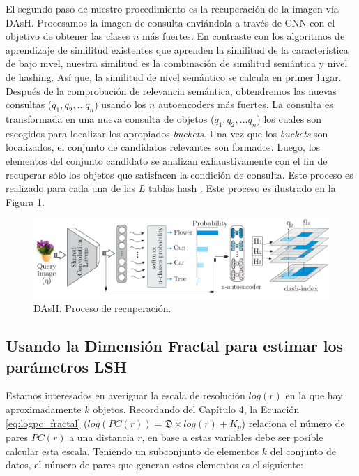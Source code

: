 El segundo paso de nuestro procedimiento es la recuperación de la imagen vía  DAsH. Procesamos la imagen de consulta enviándola a través de CNN con el objetivo de obtener las clases $n$ más fuertes. En contraste con los algoritmos de aprendizaje de similitud existentes que aprenden la similitud de la característica de bajo nivel, nuestra similitud es la combinación de similitud semántica y nivel de hashing. Así que, la similitud de nivel semántico se calcula en primer lugar. Después de la comprobación de relevancia semántica, obtendremos las nuevas consultas ($q_1, q_2, ... q_n$) usando los  $n$ autoencoders más fuertes. La consulta es transformada en una nueva consulta de objetos ($q_1, q_2, ... q_n$) los cuales son escogidos para localizar los apropiados \textit{buckets}. Una vez que los \textit{buckets} son localizados, el conjunto de candidatos relevantes son formados.  Luego, los elementos del conjunto candidato se analizan exhaustivamente con el fin de recuperar sólo los objetos que satisfacen la condición de consulta. Este proceso es realizado para cada una de las  $L$ tablas hash . Este proceso es ilustrado en la Figura \ref{fig:qdash}.  
\begin{figure}[htp]
\centering
 \includegraphics[width=1.00\columnwidth]{chapter6/DAsh_retrieval_final.pdf} 
 \caption{ DAsH. Proceso de recuperación. } 
\label{fig:qdash}
\end{figure} 
 
 \newpage

 \subsection{Usando la Dimensión Fractal para estimar los parámetros LSH}
 
 

Estamos interesados en averiguar la escala de resolución $log(r)$ en la que hay aproximadamente $k$ objetos. Recordando del Capítulo 4, la Ecuación \ref{eq:logpc_fractal} ($log(PC(r)) = \mathfrak{D} \times log (r) + K_p$) relaciona el número de pares $PC(r)$ a una distancia $r$, en base a estas   variables  debe ser posible calcular esta escala. Teniendo un subconjunto de elementos $k$ del conjunto de datos, el número de pares que generan estos elementos es el siguiente: 
 
